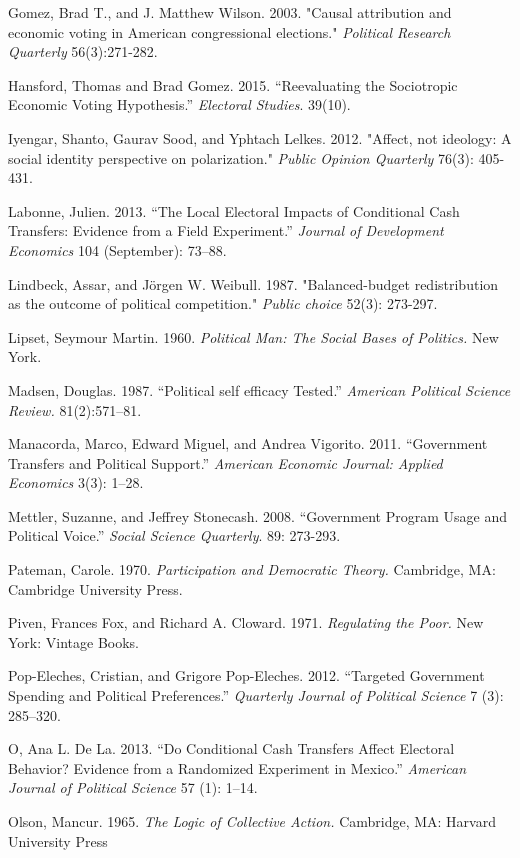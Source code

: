 \documentclass[12pt]{paper}
\begin{document}
\begin{hangparas}{.25in}{1}
Gomez, Brad T., and J. Matthew Wilson. 2003. "Causal attribution and economic voting in American congressional elections." \textit{Political Research Quarterly} 56(3):271-282.

Hansford, Thomas and Brad Gomez. 2015. “Reevaluating the Sociotropic Economic Voting Hypothesis.” \textit{Electoral Studies}. 39(10).

Iyengar, Shanto, Gaurav Sood, and Yphtach Lelkes. 2012. "Affect, not ideology: A social identity perspective on polarization." \textit{Public Opinion Quarterly} 76(3): 405-431.

Labonne, Julien. 2013. “The Local Electoral Impacts of Conditional Cash Transfers: Evidence from a Field Experiment.” \textit{Journal of Development Economics} 104 (September): 73–88.

Lindbeck, Assar, and Jörgen W. Weibull. 1987. "Balanced-budget redistribution as the outcome of political competition." \textit{Public choice} 52(3): 273-297.

Lipset, Seymour Martin. 1960. \textit{Political Man: The Social Bases of Politics.} New York. 

Madsen, Douglas. 1987. “Political self efficacy Tested.” \textit{American Political Science Review.} 81(2):571–81.

Manacorda, Marco, Edward Miguel, and Andrea Vigorito. 2011. “Government Transfers and Political Support.” \textit{American Economic Journal: Applied Economics} 3(3): 1–28.

Mettler, Suzanne, and Jeffrey Stonecash. 2008. “Government Program Usage and Political Voice.” \textit{Social Science Quarterly}. 89: 273-293. 


Pateman, Carole. 1970. \textit{Participation and Democratic Theory. }Cambridge, MA: Cambridge University Press.


Piven, Frances Fox, and Richard A. Cloward. 1971. \textit{Regulating the Poor.} New York: Vintage Books.


Pop-Eleches, Cristian, and Grigore Pop-Eleches. 2012. “Targeted Government Spending and Political Preferences.” \textit{Quarterly Journal of Political Science} 7 (3): 285–320.


O, Ana L. De La. 2013. “Do Conditional Cash Transfers Affect Electoral Behavior? Evidence from a Randomized Experiment in Mexico.” \textit{American Journal of Political Science} 57 (1): 1–14.


Olson, Mancur. 1965. \textit{The Logic of Collective Action.} Cambridge, MA: Harvard University Press


\end{hangparas}
\end{document}
